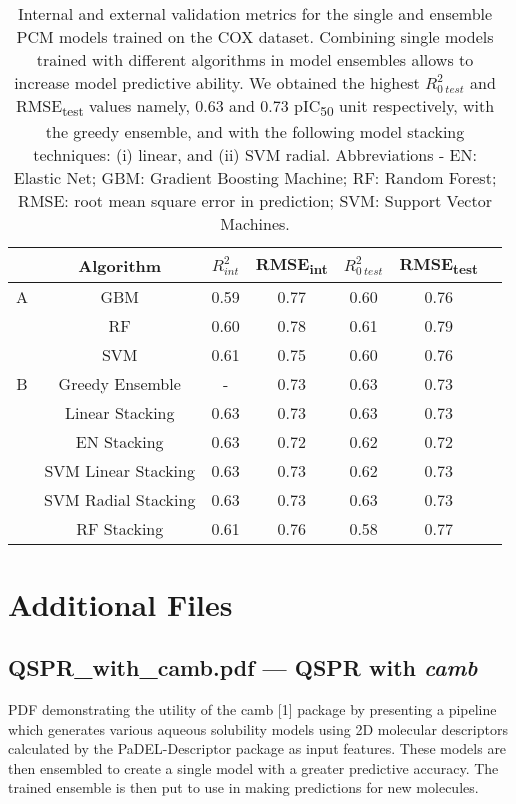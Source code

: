\documentclass{bmcart}
\begin{document}
\begin{backmatter}
\begin{table}[!htb]
\centering
\begin{tabular}[0.5width=\textwidth]{cccccc p{1cm}}
\hline
& Algorithm & $R^{2}_{int}$ & RMSE\textsubscript{int} & $R^{2}_{0\ test}$ & RMSE\textsubscript{test}\\
\hline
A &  GBM & 0.59 & 0.77 & 0.60 & 0.76 \\
 &  RF & 0.60 & 0.78 & 0.61 & 0.79 \\
 &  SVM & 0.61 & 0.75 & 0.60 & 0.76 \\
\hline
B & Greedy Ensemble  & - & 0.73  & 0.63 & 0.73 \\
 &  Linear Stacking & 0.63 & 0.73 &  0.63 & 0.73 \\
 &  EN Stacking & 0.63  & 0.72 & 0.62 & 0.72  \\
 &  SVM Linear Stacking &0.63 & 0.73 & 0.62 & 0.73 \\
 &  SVM Radial Stacking & 0.63 & 0.73 & 0.63 & 0.73 \\
 &  RF Stacking & 0.61 & 0.76 & 0.58 & 0.77 \\
\hline
\end{tabular}
\caption{Internal and external validation metrics for the single and ensemble PCM models trained on the COX dataset. 
Combining single models trained with different algorithms in model ensembles allows to increase model predictive ability.
We obtained the highest $R^{2}_{0\ test}$ and RMSE\textsubscript{test} values namely, 0.63 and 0.73 pIC\textsubscript{50} unit respectively, 
with the greedy ensemble, and with the following model stacking techniques:
(i) linear, and (ii) SVM radial. Abbreviations - EN: Elastic Net; GBM: Gradient Boosting Machine; RF: Random Forest; RMSE: root mean square error in prediction; SVM: Support Vector Machines.}
\label{tab:cox_perf}
\end{table}


\section*{Additional Files}
 \subsection*{QSPR\_with\_camb.pdf --- QSPR with \textit{camb}}
    PDF demonstrating the utility of the camb [1] package by presenting a pipeline which generates various aqueous solubility models using 2D molecular descriptors calculated by the PaDEL-Descriptor package as input features. These models are then ensembled to create a single model with a greater predictive accuracy. The trained ensemble is then put to use in making predictions for new molecules.


\end{backmatter}
\end{document}
